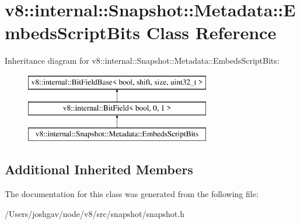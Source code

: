 \hypertarget{classv8_1_1internal_1_1_snapshot_1_1_metadata_1_1_embeds_script_bits}{}\section{v8\+:\+:internal\+:\+:Snapshot\+:\+:Metadata\+:\+:Embeds\+Script\+Bits Class Reference}
\label{classv8_1_1internal_1_1_snapshot_1_1_metadata_1_1_embeds_script_bits}
Inheritance diagram for v8\+:\+:internal\+:\+:Snapshot\+:\+:Metadata\+:\+:Embeds\+Script\+Bits\+:\begin{figure}[H]
\begin{center}
\leavevmode
\includegraphics[height=3.000000cm]{classv8_1_1internal_1_1_snapshot_1_1_metadata_1_1_embeds_script_bits}
\end{center}
\end{figure}
\subsection*{Additional Inherited Members}


The documentation for this class was generated from the following file\+:\begin{DoxyCompactItemize}
\item 
/\+Users/joshgav/node/v8/src/snapshot/snapshot.\+h\end{DoxyCompactItemize}
